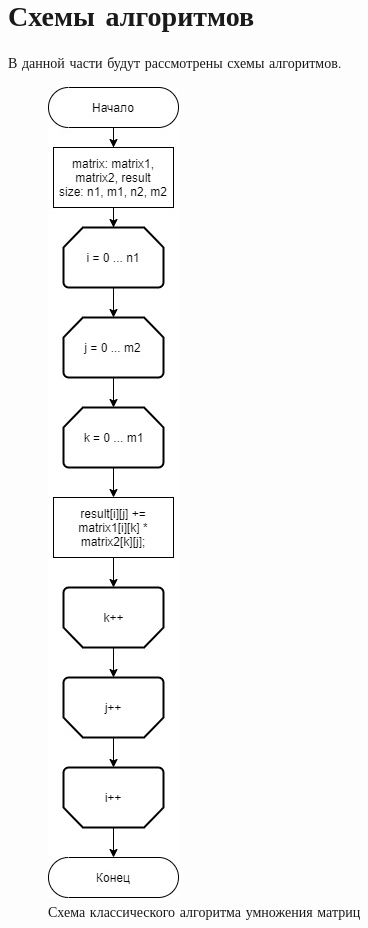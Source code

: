 \documentclass[12pt]{report}
\begin{document}
\section{Схемы алгоритмов}
В данной части будут рассмотрены схемы алгоритмов.

\begin{figure}[!htbp]
\centering
\includegraphics[scale=0.7]{alg1.jpg}
\caption{Схема классического алгоритма умножения матриц}
\label{fig:mpr}
\end{figure}
\end{document}
